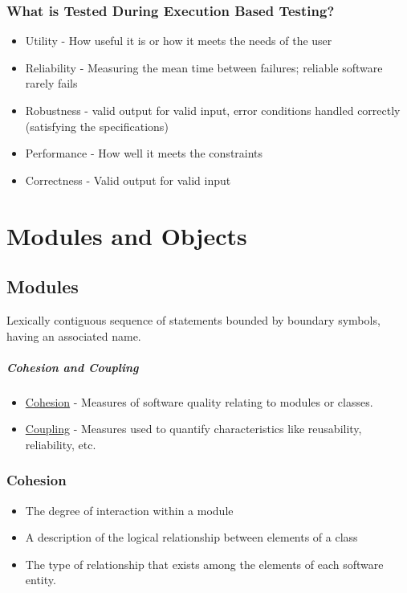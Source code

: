 \documentclass{report}
\begin{document}
			\subsection{What is Tested During Execution Based Testing?}
				\begin{itemize}
					\item Utility - How useful it is or how it meets the needs of the user
					\item Reliability - Measuring the mean time between failures; reliable software rarely fails
					\item Robustness - valid output for valid input, error conditions handled correctly (satisfying the specifications)
					\item Performance - How well it meets the constraints
					\item Correctness - Valid output for valid input
				\end{itemize}
	\chapter{Modules and Objects}
		\section{Modules}
			Lexically contiguous sequence of statements bounded by boundary symbols, having an associated name.
			\paragraph{Cohesion and Coupling}
				\begin{itemize}
					\item \underline{Cohesion} - Measures of software quality relating to modules or classes.
					\item \underline{Coupling} - Measures used to quantify characteristics like reusability, reliability, etc.
				\end{itemize}
			\subsection{Cohesion}
				\begin{itemize}
					\item The degree of interaction within a module
					\item A description of the logical relationship between elements of a class
					\item The type of relationship that exists among the elements of each software entity.
				\end{itemize}
\end{document}
